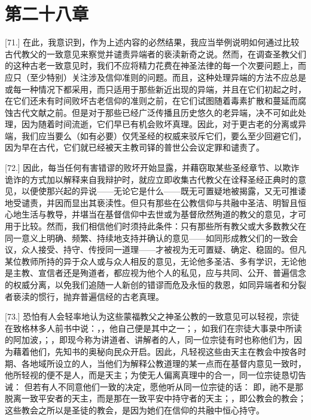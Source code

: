 
\section{第二十八章}

\par

[71.] 在此，我意识到，作为上述内容的必然结果，我应当举例说明如何通过比较古代教父的一致意见来察觉并谴责异端者的亵渎新奇之说。然而，在调查圣教父们的这种古老一致意见时，我们不应将精力花费在神圣法律的每一个次要问题上，而应只（至少特别）关注涉及信仰准则的问题。而且，这种处理异端的方法不应总是或每一种情况下都采用，而只适用于那些新近出现的异端，并且在它们初起之时，在它们还未有时间败坏古老信仰的准则之前，在它们试图随着毒素扩散和蔓延而腐蚀古代文献之前。但是对于那些已经广泛传播且历史悠久的老异端，决不可如此处理，因为随着时间流逝，它们早已有机会败坏真理。因此，对于更古老的分离或异端，我们应当要么（如有必要）仅凭圣经的权威来驳斥它们，要么至少回避它们，因为早在古代，它们就已经被天主教司铎的普世公会议定罪和谴责了。\par

[72.] 因此，每当任何有害错谬的败坏开始显露，并藉窃取某些圣经章节、以欺诈诡诈的方式加以解释来自我辩护时，就应立即收集古代教父在诠释圣经正典时的意见，以便使那兴起的异说——无论它是什么——既无可置疑地被揭露，又无可推诿地受谴责，并因而显出其亵渎性。但只有那些在公教信仰与共融中圣洁、明智且恒心地生活与教导，并堪当在基督信仰中去世或为基督欣然殉道的教父的意见，才可用于比较。然而，我们相信他们时须持此条件：只有那些所有教父或大多数教父在同一意义上明确、频繁、持续地支持并确认的意见——如同形成教父们的一致会议，众人接受、持守、传授同一道理——才被视为无可置疑、确定、稳固的。但凡某位教师所持的异于众人或与众人相反的意见，无论他多圣洁、多有学识，无论他是主教、宣信者还是殉道者，都应视为他个人的私见，应与共同、公开、普遍信念的权威分离，以免我们追随一人新创的错谬而危及永恒的救恩，如同异端者和分裂者亵渎的惯行，抛弃普遍信经的古老真理。\par

[73.] 恐怕有人会轻率地认为这些蒙福教父之神圣公教的一致意见可以轻视，宗徒在致格林多人前书中说：，，他自己便是其中之一；，如我们在宗徒大事录中所读的阿加波，；，即现今称为讲道者、讲解者的人，同一位宗徒有时也称他们为，因为藉着他们，先知书的奥秘向民众开启。因此，凡轻视这些由天主在教会中按各时期、各地域所设立的人，当他们为解释公教道理的某一点而在基督内意见一致时，他所轻视的便不是人，而是天主；为使无人偏离真理中的合一，同一位宗徒恳切告诫： 但若有人不同意他们一致的决定，愿他听从同一位宗徒的话： 即，祂不是那脱离一致平安者的天主，而是那在一致平安中持守者的天主；，即公教会的教会；这些教会之所以是圣徒的教会，是因为她们在信仰的共融中恒心持守。\par


